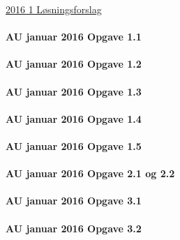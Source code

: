 \documentclass[]{book}
\let\oldparagraph\paragraph
\renewcommand{\paragraph}[1]{\oldparagraph{#1}\mbox{}}
\begin{document}
\href{https://www.dropbox.com/s/vk2igqyofts6fes/AU\%20Statistik\%20eksamensopgave\%20-\%20januar\%202016\%20l\%C3\%B8sningsforslag.docx?dl=1}{2016 1 Løsningsforslag}

\hypertarget{au-januar-2016-opgave-1.1}{%
\paragraph{AU januar 2016 Opgave 1.1}\label{au-januar-2016-opgave-1.1}}

\hypertarget{au-januar-2016-opgave-1.2}{%
\paragraph{AU januar 2016 Opgave 1.2}\label{au-januar-2016-opgave-1.2}}

\hypertarget{au-januar-2016-opgave-1.3}{%
\paragraph{AU januar 2016 Opgave 1.3}\label{au-januar-2016-opgave-1.3}}

\hypertarget{au-januar-2016-opgave-1.4}{%
\paragraph{AU januar 2016 Opgave 1.4}\label{au-januar-2016-opgave-1.4}}

\hypertarget{au-januar-2016-opgave-1.5}{%
\paragraph{AU januar 2016 Opgave 1.5}\label{au-januar-2016-opgave-1.5}}

\hypertarget{au-januar-2016-opgave-2.1-og-2.2}{%
\paragraph{AU januar 2016 Opgave 2.1 og 2.2}\label{au-januar-2016-opgave-2.1-og-2.2}}

\hypertarget{au-januar-2016-opgave-3.1}{%
\paragraph{AU januar 2016 Opgave 3.1}\label{au-januar-2016-opgave-3.1}}

\hypertarget{au-januar-2016-opgave-3.2}{%
\paragraph{AU januar 2016 Opgave 3.2}\label{au-januar-2016-opgave-3.2}}
\end{document}
